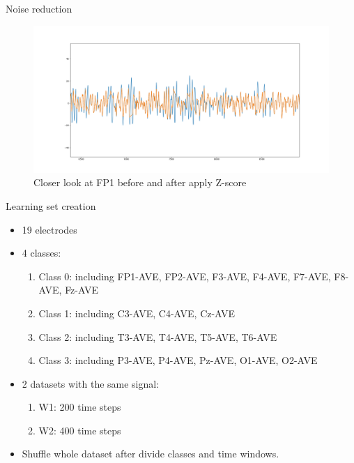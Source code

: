 \documentclass[xcolor=dvipsnames]{beamer} %
\begin{document}
	\begin{frame}{Noise reduction}
	    \begin{figure}
	        \centering
	        \includegraphics[scale=0.23]{images/Figure_1.png}
	        \caption{Closer look at FP1 before and after apply Z-score}
	        \label{fig:FP1close}
	    \end{figure}
	\end{frame}
	
	\begin{frame}{Learning set creation}
	    \begin{itemize}
	        \item 19 electrodes
	        \pause
	        \item 4 classes:
	            \begin{enumerate}
	                \item Class 0: including FP1-AVE, FP2-AVE, F3-AVE, F4-AVE, F7-AVE, F8-AVE, Fz-AVE
	                \item Class 1: including C3-AVE, C4-AVE, Cz-AVE
	                \item Class 2: including T3-AVE, T4-AVE, T5-AVE, T6-AVE
	                \item Class 3: including P3-AVE, P4-AVE, Pz-AVE, O1-AVE,  O2-AVE
	            \end{enumerate}
            \pause
	        \item 2 datasets with the same signal:
	            \begin{enumerate}
	                \item W1: 200 time steps
	                \item W2: 400 time steps
	            \end{enumerate}
            \pause
	       \item Shuffle whole dataset after divide classes and time windows.
	    \end{itemize}
	\end{frame}
	
\end{document}
